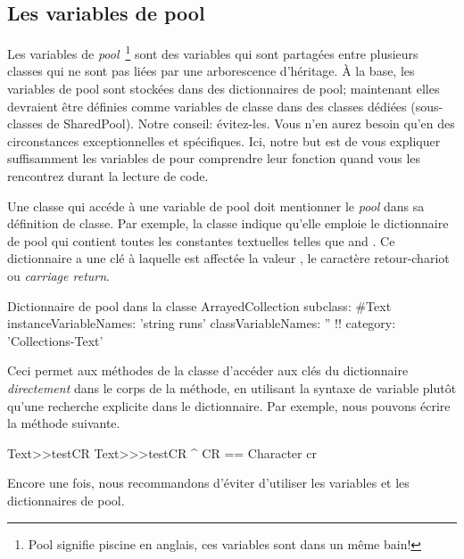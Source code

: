 \documentclass[a4paper,10pt,twoside]{book}
\begin{document}
\subsection{Les variables de pool}
Les variables de \emph{pool}~\footnote{Pool signifie piscine en anglais, ces variables sont dans un m\^eme bain!} sont des variables qui sont partag\'ees entre plusieurs classes qui ne sont pas li\'ees par une arborescence d'h\'eritage.
\`A la base, les variables de pool sont stock\'ees dans des dictionnaires
de pool;  maintenant elles devraient \^etre d\'efinies comme variables
de classe dans des classes d\'edi\'ees (sous-classes de SharedPool).
Notre conseil: \'evitez-les. Vous n'en aurez besoin qu'en des circonstances
exceptionnelles et sp\'ecifiques.
Ici, notre but est de vous expliquer suffisamment les variables de
 pour comprendre leur fonction quand vous les
rencontrez durant la lecture de code.

Une classe qui acc\'ede \`a une variable de pool doit mentionner le \emph{pool}
dans sa d\'efinition de classe.
Par exemple, la classe  indique qu'elle emploie le dictionnaire
de pool  qui contient toutes les constantes textuelles
telles que 
 and . 
Ce dictionnaire a une cl\'e  \`a laquelle est affect\'ee la valeur
, \ie le caract\`ere retour-chariot ou \emph{carriage return}.

\begin{classdef}[textpooldict]{Dictionnaire de pool dans la classe }
ArrayedCollection subclass: #Text
        instanceVariableNames: 'string runs' 	
        classVariableNames: '' 	
        !!
        category: 'Collections-Text'
\end{classdef}
   
Ceci permet aux m\'ethodes de la classe  d'acc\'eder aux cl\'es
du dictionnaire \emph{directement} dans le corps de la m\'ethode, \ie 
en utilisant la syntaxe de variable plut\^ot qu'une recherche explicite
dans le dictionnaire.
Par exemple, nous pouvons \'ecrire la m\'ethode suivante.
  
\begin{method}[texttestcr]{Text>>testCR}
Text>>>testCR 	
      ^ CR == Character cr
\end{method}

Encore une fois, nous recommandons d'\'eviter d'utiliser
les variables et les dictionnaires de pool.
\end{document}
